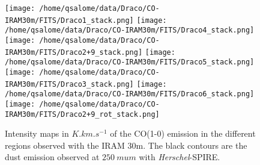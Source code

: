 \documentclass[traditabstract]{aa}
\begin{document}

\begin{figure*}[h]
  \centering
  \texttt{[image: /home/qsalome/data/Draco/CO-IRAM30m/FITS/Draco1\_stack.png]}
  \hspace{3mm}
  \texttt{[image: /home/qsalome/data/Draco/CO-IRAM30m/FITS/Draco4\_stack.png]} \\
  \texttt{[image: /home/qsalome/data/Draco/CO-IRAM30m/FITS/Draco2+9\_stack.png]}
  \hspace{3mm}
  \texttt{[image: /home/qsalome/data/Draco/CO-IRAM30m/FITS/Draco5\_stack.png]} \\
  \texttt{[image: /home/qsalome/data/Draco/CO-IRAM30m/FITS/Draco3\_stack.png]}
  \hspace{3mm}
  \texttt{[image: /home/qsalome/data/Draco/CO-IRAM30m/FITS/Draco6\_stack.png]} \\
  \texttt{[image: /home/qsalome/data/Draco/CO-IRAM30m/FITS/Draco2+9\_rot\_stack.png]}
  \caption{\label{Draco_CO10} Intensity maps in $K.km.s^{-1}$ of the CO(1-0) emission in the different regions observed with the IRAM 30m. The black contours are the dust emission observed at $250\: mu m$ with \emph{Herschel}-SPIRE.}
\end{figure*}
\end{document}

